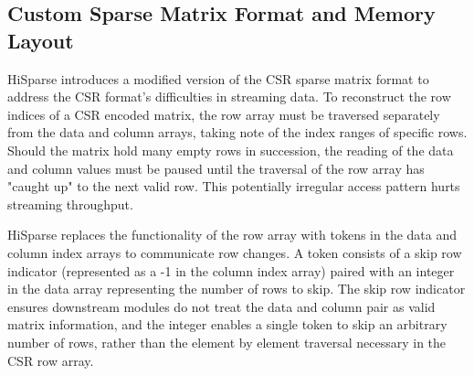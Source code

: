 
\subsection{Custom Sparse Matrix Format and Memory Layout}
HiSparse introduces a modified version of the CSR sparse matrix format to address the CSR format's difficulties in streaming data. To reconstruct the row indices of a CSR encoded matrix, the row array must be traversed separately from the data and column arrays, taking note of the index ranges of specific rows. Should the matrix hold many empty rows in succession, the reading of the data and column values must be paused until the traversal of the row array has "caught up" to the next valid row. This potentially irregular access pattern hurts streaming throughput.

HiSparse replaces the functionality of the row array with tokens in the data and column index arrays to communicate row changes. A token consists of a skip row indicator (represented as a -1 in the column index array) paired with an integer in the data array representing the number of rows to skip. The skip row indicator ensures downstream modules do not treat the data and column pair as valid matrix information, and the integer enables a single token to skip an arbitrary number of rows, rather than the element by element traversal necessary in the CSR row array.

